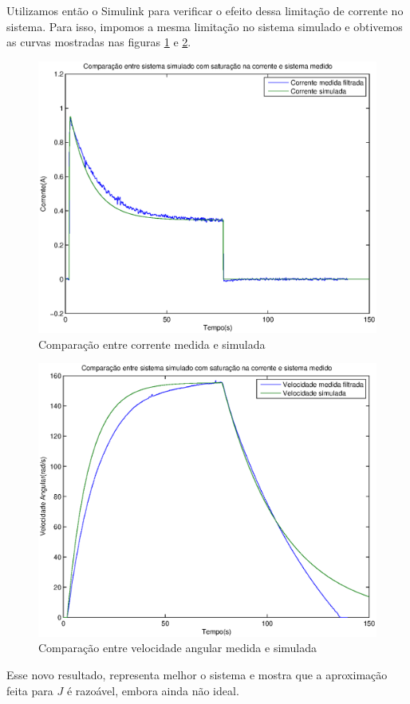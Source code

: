 \documentclass{article}
\begin{document}
Utilizamos então o Simulink para verificar o efeito dessa limitação de corrente no sistema. Para isso, impomos a mesma limitação no sistema simulado e obtivemos as curvas mostradas nas figuras \ref{fig:simisat} e \ref{fig:simvsat}.

\begin{figure}[H]
	\centering
	\includegraphics[width=0.8\linewidth]{../simisat}
	\caption{Comparação entre corrente medida e simulada}
	\label{fig:simisat}
\end{figure}
\begin{figure}[H]
	\centering
	\includegraphics[width=0.8\linewidth]{../simvsat}
	\caption{Comparação entre velocidade angular medida e simulada}
	\label{fig:simvsat}
\end{figure}

Esse novo resultado, representa melhor o sistema e mostra que a aproximação feita para $J$ é razoável, embora ainda não ideal.

\begin{thebibliography}{widestlabel}
\end{thebibliography}
\end{document}
